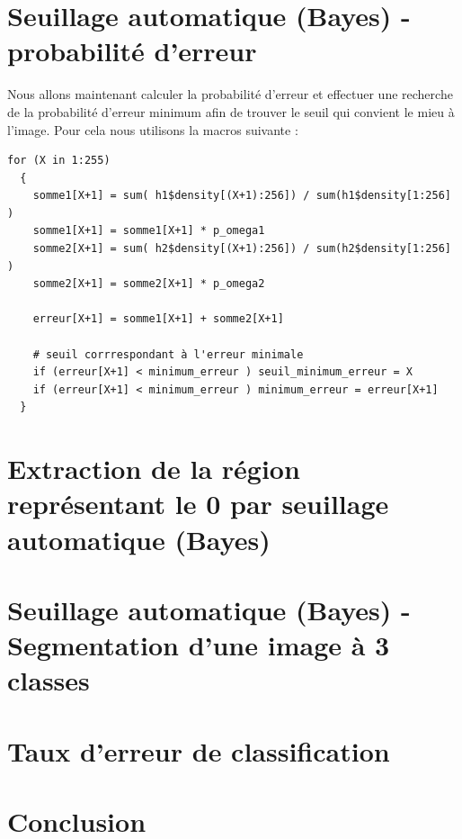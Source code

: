 \documentclass[a4paper,11pt]{article}
\begin{document}
  \section{Seuillage automatique (Bayes) - probabilité d’erreur}
  Nous allons maintenant calculer la probabilité d'erreur et effectuer une recherche de la 
  probabilité d'erreur minimum afin de trouver le seuil qui convient le mieu à l'image.
  Pour cela nous utilisons la macros suivante :
  
  \begin{lstlisting}[caption=Macros de calcule de probabilité à priori des classe $N_{w_1}$ et $N_{w_2}$]
  for (X in 1:255) 
  { 
    somme1[X+1] = sum( h1$density[(X+1):256]) / sum(h1$density[1:256] )
    somme1[X+1] = somme1[X+1] * p_omega1  
    somme2[X+1] = sum( h2$density[(X+1):256]) / sum(h2$density[1:256] )
    somme2[X+1] = somme2[X+1] * p_omega2

    erreur[X+1] = somme1[X+1] + somme2[X+1]
    
    # seuil corrrespondant à l'erreur minimale
    if (erreur[X+1] < minimum_erreur ) seuil_minimum_erreur = X
    if (erreur[X+1] < minimum_erreur ) minimum_erreur = erreur[X+1]
  }
  \end{lstlisting}
  
  
  \section{Extraction de la région représentant le 0 par seuillage automatique (Bayes)}
  
  \section{Seuillage automatique (Bayes) - Segmentation d’une image à 3 classes}
  
  \section{Taux d’erreur de classification}
  
  \section*{Conclusion}
 
    
\end{document}
